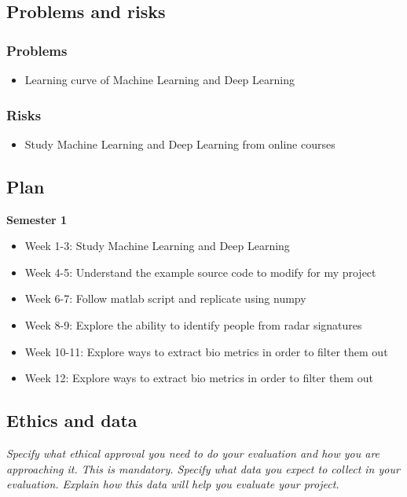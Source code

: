 \documentclass[11pt]{article}
\begin{document}
\subsection{Problems and risks}\label{problems-and-risks}

\subsubsection{Problems}\label{problems}

\begin{itemize}
  \item Learning curve of Machine Learning and Deep Learning
\end{itemize}

\subsubsection{Risks}\label{risks}

\begin{itemize}
  \item Study Machine Learning and Deep Learning from online courses
\end{itemize}

\subsection{Plan}\label{plan}
\textbf{Semester 1}
\begin{itemize}
  \item Week 1-3: Study Machine Learning and Deep Learning
  \item Week 4-5: Understand the example source code to modify for my project
  \item Week 6-7: Follow matlab script and replicate using numpy
  \item Week 8-9: Explore the ability to identify people from radar signatures
  \item Week 10-11: Explore ways to extract bio metrics in order to filter them out
  \item Week 12: Explore ways to extract bio metrics in order to filter them out
\end{itemize}

\subsection{Ethics and data}\label{ethics}
\emph{Specify what ethical approval you need to do your evaluation and how you are approaching it. This is mandatory. 
Specify what data you expect to collect in your evaluation. Explain how this data will help you evaluate your project.
}
\end{document}
